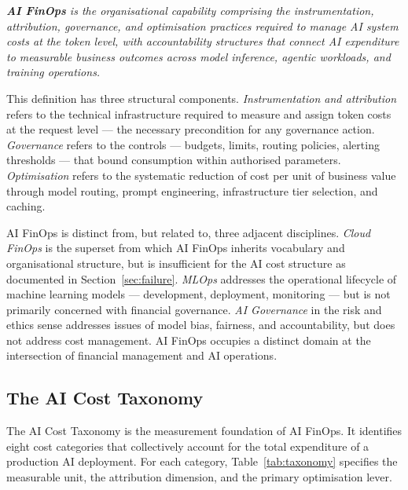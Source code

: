 \documentclass[11pt,twocolumn]{article}
\begin{document}
\begin{mdframed}[backgroundcolor=lightgray, linecolor=teal, linewidth=1.5pt,
  innerleftmargin=10pt, innerrightmargin=10pt,
  innertopmargin=8pt, innerbottommargin=8pt]
\small\textit{\textbf{AI FinOps} is the organisational capability comprising the
instrumentation, attribution, governance, and optimisation practices required to
manage AI system costs at the token level, with accountability structures that
connect AI expenditure to measurable business outcomes across model inference,
agentic workloads, and training operations.}
\end{mdframed}

\vspace{4pt}
This definition has three structural components. \textit{Instrumentation and attribution}
refers to the technical infrastructure required to measure and assign token costs
at the request level --- the necessary precondition for any governance action.
\textit{Governance} refers to the controls --- budgets, limits, routing policies,
alerting thresholds --- that bound consumption within authorised parameters.
\textit{Optimisation} refers to the systematic reduction of cost per unit of
business value through model routing, prompt engineering, infrastructure tier
selection, and caching.

AI FinOps is distinct from, but related to, three adjacent disciplines.
\textit{Cloud FinOps} is the superset from which AI FinOps inherits vocabulary
and organisational structure, but is insufficient for the AI cost structure as
documented in Section~\ref{sec:failure}. \textit{MLOps} addresses the operational
lifecycle of machine learning models --- development, deployment, monitoring --- but
is not primarily concerned with financial governance. \textit{AI Governance} in the
risk and ethics sense addresses issues of model bias, fairness, and accountability,
but does not address cost management. AI FinOps occupies a distinct domain at the
intersection of financial management and AI operations.

\subsection{The AI Cost Taxonomy}
\label{sec:taxonomy}

The AI Cost Taxonomy is the measurement foundation of AI FinOps. It identifies
eight cost categories that collectively account for the total expenditure of a
production AI deployment. For each category, Table~\ref{tab:taxonomy} specifies
the measurable unit, the attribution dimension, and the primary optimisation lever.
\end{document}
